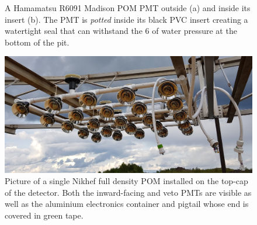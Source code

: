 \begin{figure} %
    \centering
    \quad
    \caption[Madison POM PMT assembly.]
    {A Hamamatsu R6091 Madison POM PMT outside (a) and inside its insert (b). The PMT is
        \emph{potted} inside its black PVC insert creating a watertight seal that can withstand
        the \unit{6}{} of water pressure at the bottom of the pit.}
    \label{fig:madison_pmt_assembly}
\end{figure}

\begin{figure} %
    \includegraphics[width=\textwidth]{diagrams/4-chips/single_plane.jpg}
    \caption[Picture of a Nikhef POM.]
    {Picture of a single Nikhef full density POM installed on the top-cap of the \chipsfive
        detector. Both the inward-facing and veto PMTs are visible as well as the aluminium
        electronics container and pigtail whose end is covered in green tape.}
    \label{fig:single_plane}
\end{figure}

